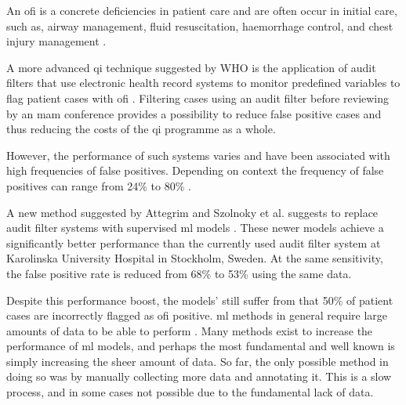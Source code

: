 \documentclass[12pt, letterpaper]{article}
\begin{document}
An \acrshort{ofi} is a concrete deficiencies in patient care and are often occur in initial care, such as, airway management, fluid resuscitation, haemorrhage control, and chest injury management \cite{world_health_organization_guidelines_2009,roy_learning_2017,oreilly_opportunities_2013,sanddal_analysis_2011}.

A more advanced \acrshort{qi} technique suggested by WHO is the application of audit filters that use electronic health record systems to monitor predefined variables to flag patient cases with \acrfull{ofi} \cite{world_health_organization_guidelines_2009}. Filtering cases using an audit filter before reviewing by an \acrshort{mam} conference provides a possibility to reduce false positive cases and thus reducing the costs of the \acrshort{qi} programme as a whole.

However, the performance of such systems varies and have been associated with high frequencies of false positives. Depending on context the frequency of false positives can range from 24\% to 80\% \cite{attergrim_predicting_2023,sanddal_analysis_2011,roy_learning_2017,ghorbani_analysis_2018}.

A new method suggested by Attegrim and Szolnoky et al. suggests to replace audit filter systems with supervised \acrfull{ml} models \cite{attergrim_predicting_2023}. These newer models achieve a significantly better performance than the currently used audit filter system at Karolinska University Hospital in Stockholm, Sweden. At the same sensitivity, the false positive rate is reduced from 68\% to 53\% using the same data.

Despite this performance boost, the models' still suffer from that 50\% of patient cases are incorrectly flagged as \acrshort{ofi} positive. \acrshort{ml} methods in general require large amounts of data to be able to perform \cite{piccialli_survey_2021}. Many methods exist to increase the performance of \acrshort{ml} models, and perhaps the most fundamental and well known is simply increasing the sheer amount of data. So far, the only possible method in doing so was by manually collecting more data and annotating it. This is a slow process, and in some cases not possible due to the fundamental lack of data.
\end{document}
